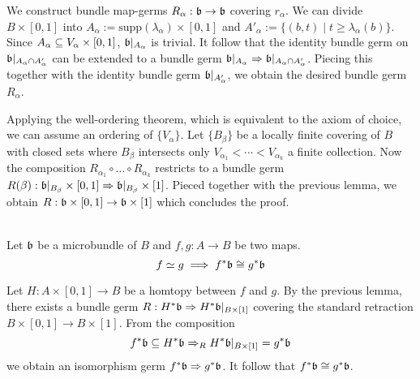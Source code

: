 \begin{file}
\begin{myproof}
We construct bundle map-germs $R_\alpha: \bb \to \bb$ covering $r_\alpha$.
We can divide $B \times [0, 1]$ into $A_\alpha := \text{supp}(\lambda_\alpha) \times [0, 1]$ and $A'_\alpha := \{(b, t) \mid t \ge \lambda_\alpha(b)\}$.
Since $A_\alpha \sub V_\alpha \times [0, 1]$, $\bb\restr{A_\alpha}$ is trivial.
It follow that the identity bundle germ on $\bb\restr{\A \cap \A[']}$ can be extended to a bundle germ $\bb\restr{\A} \double \bb\restr{\A \cap \A[']}$.
Piecing this together with the identity bundle germ $\bb\restr{\A[']}$, we obtain the desired bundle germ $R_\alpha$.

Applying the well-ordering theorem, which is equivalent to the axiom of choice, we can assume an ordering of $\{ V_\alpha \}$.
Let $\{B_\beta\}$ be a locally finite covering of $B$ with closed sets where $B_\beta$ intersects only $V_{\alpha_1} < \cdots < V_{\alpha_k}$ a finite collection.
Now the composition $R_{\alpha_1} \circ \ldots \circ R_{\alpha_k}$ restricts to a bundle germ $R(\beta): \bb\restr{B_\beta} \times [0, 1] \double \bb\restr{B_\beta} \times [1]$.
Pieced together with the previous lemma, we obtain $R: \bb \times [0, 1]\to \bb \times [1]$ which concludes the proof.
\end{myproof}

 \\
Let $\bb$ be a microbundle of $B$ and $f, g: A \to B$ be two maps.
\[ f \simeq g \implies f^*\bb \cong g^*\bb \]
\begin{myproof}
Let $H: A \times [0, 1] \to B$ be a homtopy between $f$ and $g$.
By the previous lemma, there exists a bundle germ $R: H^*\bb \double H^*\bb\restr{B \times [1]}$ covering the standard retraction $B \times [0, 1] \to B \times [1]$.
From the composition
\[ f^*\bb \sub H^*\bb \double_R H^*\bb\restr{B \times [1]} = g^*\bb \]
we obtain an isomorphism germ $f^*\bb \double g^*\bb$.
It follow that $f^*\bb \cong g^*\bb$.
\end{myproof}

\end{file}